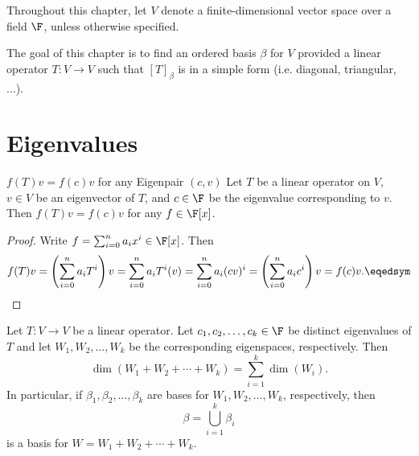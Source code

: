 \documentclass[linearalgebraII]{subfiles}
\begin{document}

    \begin{remark}
        Throughout this chapter, let $V$ denote a finite-dimensional vector space over a field $\F$, unless otherwise specified.
    \end{remark}

    \begin{remark}
        The goal of this chapter is to find an ordered basis $\beta$ for $V$ provided a linear operator $T:V\to V$ such that $\left[ T \right] _\beta$ is in a simple form (i.e. diagonal, triangular, ...).
    \end{remark}

    \section{Eigenvalues}

    \begin{prop}{$f(T)v = f(c)v$ for any Eigenpair $(c,v)$}
        Let $T$ be a linear operator on $V$, $v\in V$ be an eigenvector of $T$, and $c\in \F$ be the eigenvalue corresponding to $v$. Then $f(T)v = f(c)v$ for any $f\in \F[x]$.
    \end{prop}

    \begin{proof}
        Write $f = \sum^{n}_{i=0} a_ix^i \in \F[x]$. Then
        \begin{equation*}
            f(T)v = \left( \sum^{n}_{i=0} a_iT^i \right) v = \sum^{n}_{i=0} a_iT^i(v) = \sum^{n}_{i=0} a_i(cv)^i = \left( \sum^{n}_{i=0} a_ic^i \right) v = f(c)v. \eqedsym
        \end{equation*}
    \end{proof}

    \begin{prop}{}
        Let $T:V\to V$ be a linear operator. Let $c_1, c_2, \ldots, c_k\in \F$ be distinct eigenvalues of $T$ and let $W_1, W_2, \ldots, W_k$ be the corresponding eigenspaces, respectively. Then
        \begin{equation*}
            \dim \left( W_1 + W_2 + \cdots + W_k \right) = \sum^{k}_{i=1} \dim(W_i). 
        \end{equation*}
        In particular, if $\beta_1, \beta_2, \ldots, \beta_k$ are bases for $W_1, W_2, \ldots, W_k$, respectively, then
        \begin{equation*}
            \beta = \bigcup^{k}_{i=1} \beta_i
        \end{equation*}
        is a basis for $W = W_1 + W_2 + \cdots + W_k$.
    \end{prop}
\end{document}
